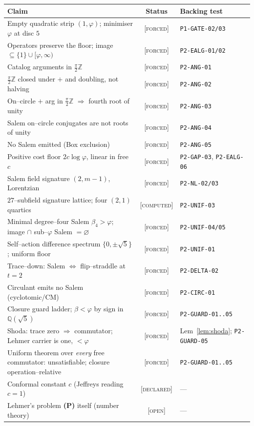\documentclass[11pt]{article}
\theoremstyle{plain}
\theoremstyle{definition}
\theoremstyle{remark}
\newcommand{\forced}{\textcolor{forcedc}{\textsc{[forced]}}}
\newcommand{\declared}{\textcolor{declaredc}{\textsc{[declared]}}}
\newcommand{\openq}{\textcolor{openc}{\textsc{[open]}}}
\newcommand{\computed}{\textcolor{forcedc}{\textsc{[computed]}}}
\newcommand{\Q}{\mathbb{Q}}
\newcommand{\Z}{\mathbb{Z}}
\begin{document}
\begin{center}
\renewcommand{\arraystretch}{1.18}
\begin{tabular}{@{}p{6.6cm}cl@{}}
\toprule
\textbf{Claim} & \textbf{Status} & \textbf{Backing test} \\
\midrule
Empty quadratic strip $(1,\varphi)$; minimiser $\varphi$ at disc $5$ & \forced & \texttt{P1-GATE-02/03} \\
Operators preserve the floor; image $\subseteq\{1\}\cup[\varphi,\infty)$ & \forced & \texttt{P2-EALG-01/02} \\
Catalog arguments in $\tfrac\pi2\Z$ & \forced & \texttt{P2-ANG-01} \\
$\tfrac\pi2\Z$ closed under $+$ and doubling, not halving & \forced & \texttt{P2-ANG-02} \\
On--circle $+$ arg in $\tfrac\pi2\Z$ $\Rightarrow$ fourth root of unity & \forced & \texttt{P2-ANG-03} \\
Salem on--circle conjugates are not roots of unity & \forced & \texttt{P2-ANG-04} \\
No Salem emitted (Box exclusion) & \forced & \texttt{P2-ANG-05} \\
Positive cost floor $2c\log\varphi$, linear in free $c$ & \forced & \texttt{P2-GAP-03}, \texttt{P2-EALG-06} \\
Salem field signature $(2,m-1)$, Lorentzian & \forced & \texttt{P2-NL-02/03} \\
$27$--subfield signature lattice; four $(2,1)$ quartics & \computed & \texttt{P2-UNIF-03} \\
Minimal degree--four Salem $\beta_4>\varphi$; image $\cap$ sub--$\varphi$ Salem $=\varnothing$ & \forced & \texttt{P2-UNIF-04/05} \\
Self--action difference spectrum $\{0,\pm\sqrt5\}$; uniform floor & \forced & \texttt{P2-UNIF-01} \\
Trace--down: Salem $\iff$ flip--straddle at $t=2$ & \forced & \texttt{P2-DELTA-02} \\
Circulant emits no Salem (cyclotomic/CM) & \forced & \texttt{P2-CIRC-01} \\
Closure guard ladder; $\beta<\varphi$ by sign in $\Q(\sqrt5)$ & \forced & \texttt{P2-GUARD-01..05} \\
Shoda: trace zero $\Rightarrow$ commutator; Lehmer carrier is one, $<\varphi$ & \forced & Lem~\ref{lem:shoda}; \texttt{P2-GUARD-05} \\
Uniform theorem over \emph{every} free commutator: unsatisfiable; closure operation--relative & \forced & \texttt{P2-GUARD-01..05} \\
Conformal constant $c$ (Jeffreys reading $c=1$) & \declared & --- \\
Lehmer's problem \textbf{(P)} itself (number theory) & \openq & --- \\
\bottomrule
\end{tabular}
\end{center}
\end{document}
